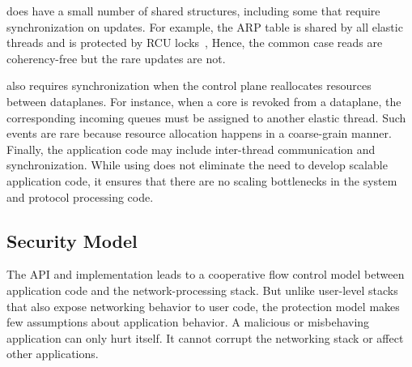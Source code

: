 



\ix does have a small number of shared structures, including some that
require synchronization on updates.  For example, the ARP table is
shared by all elastic threads and is protected by RCU
locks~\cite{mckenney1998read}, Hence, the common case reads are
coherency-free but the rare updates are not.
%

\ix also requires
synchronization when the control plane reallocates resources between
dataplanes.  For instance, when a core is revoked from a dataplane,
the corresponding incoming queues must be assigned to another elastic
thread. Such events are rare because resource allocation happens in a
coarse-grain manner. Finally, the application code may include
inter-thread communication and synchronization. While using \ix does
not eliminate the need to develop scalable application code, it
ensures that there are no scaling bottlenecks in the system and
protocol processing code. 

\subsection{Security Model}
\label{sec:impl:coop}


The \ix API and implementation leads to a cooperative flow control
model between application code and the network-processing stack.  But
unlike user-level stacks that also expose networking behavior to user
code,
the \ix protection model makes few assumptions about application
behavior. A malicious or misbehaving application can only hurt
itself. It cannot corrupt the networking stack or affect other
applications.

